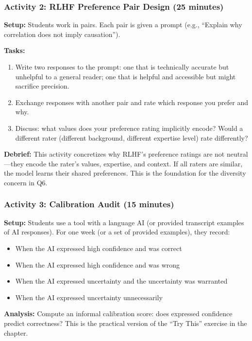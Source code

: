 \subsubsection*{Activity 2: RLHF Preference Pair Design (25 minutes)}

\textbf{Setup:} Students work in pairs. Each pair is given a prompt (e.g., ``Explain why correlation does not imply causation'').

\textbf{Tasks:}
\begin{enumerate}
    \item Write two responses to the prompt: one that is technically accurate but unhelpful to a general reader; one that is helpful and accessible but might sacrifice precision.
    \item Exchange responses with another pair and rate which response you prefer and why.
    \item Discuss: what values does your preference rating implicitly encode? Would a different rater (different background, different expertise level) rate differently?
\end{enumerate}

\textbf{Debrief:} This activity concretizes why RLHF's preference ratings are not neutral---they encode the rater's values, expertise, and context. If all raters are similar, the model learns their shared preferences. This is the foundation for the diversity concern in Q6.

\subsubsection*{Activity 3: Calibration Audit (15 minutes)}

\textbf{Setup:} Students use a tool with a language AI (or provided transcript examples of AI responses). For one week (or a set of provided examples), they record:
\begin{itemize}
    \item When the AI expressed high confidence and was correct
    \item When the AI expressed high confidence and was wrong
    \item When the AI expressed uncertainty and the uncertainty was warranted
    \item When the AI expressed uncertainty unnecessarily
\end{itemize}

\textbf{Analysis:} Compute an informal calibration score: does expressed confidence predict correctness? This is the practical version of the ``Try This'' exercise in the chapter.

